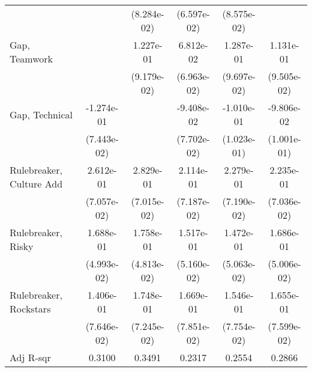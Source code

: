 {\begin{tabular}{l*{5}{c}}
                             &                             & (8.284e-02)                 & (6.597e-02)                 & (8.575e-02)                 &                             \\
    \addlinespace
    Gap, Teamwork            &                             & 1.227e-01                   & 6.812e-02                   & 1.287e-01                   & 1.131e-01                   \\
                             &                             & (9.179e-02)                 & (6.963e-02)                 & (9.697e-02)                 & (9.505e-02)                 \\
    \addlinespace
    Gap, Technical           & -1.274e-01\sym{+}           &                             & -9.408e-02                  & -1.010e-01                  & -9.806e-02                  \\
                             & (7.443e-02)                 &                             & (7.702e-02)                 & (1.023e-01)                 & (1.001e-01)                 \\
    \addlinespace
    Rulebreaker, Culture Add & 2.612e-01\sym{**}           & 2.829e-01\sym{**}           & 2.114e-01\sym{*}            & 2.279e-01\sym{*}            & 2.235e-01\sym{*}            \\
                             & (7.057e-02)                 & (7.015e-02)                 & (7.187e-02)                 & (7.190e-02)                 & (7.036e-02)                 \\
    \addlinespace
    Rulebreaker, Risky       & 1.688e-01\sym{**}           & 1.758e-01\sym{**}           & 1.517e-01\sym{*}            & 1.472e-01\sym{*}            & 1.686e-01\sym{**}           \\
                             & (4.993e-02)                 & (4.813e-02)                 & (5.160e-02)                 & (5.063e-02)                 & (5.006e-02)                 \\
    \addlinespace
    Rulebreaker, Rockstars   & 1.406e-01\sym{+}            & 1.748e-01\sym{++}           & 1.669e-01\sym{++}           & 1.546e-01\sym{++}           & 1.655e-01\sym{++}           \\
                             & (7.646e-02)                 & (7.245e-02)                 & (7.851e-02)                 & (7.754e-02)                 & (7.599e-02)                 \\
    \midrule
    Adj R-sqr                & 0.3100                      & 0.3491                      & 0.2317                      & 0.2554                      & 0.2866                      \\

\end{tabular}}

